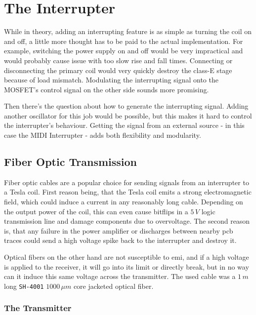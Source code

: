 \section{The Interrupter}

While in theory, adding an interrupting feature is as simple as turning the coil on and off, a little more thought has to be paid to the actual implementation. For example, switching the power supply on and off would be very impractical and would probably cause issue with too slow rise and fall times. Connecting or disconnecting the primary coil would very quickly destroy the class-E stage because of load mismatch. Modulating the interrupting signal onto the MOSFET's control signal on the other side sounds more promising.

Then there's the question about how to generate the interrupting signal. Adding another oscillator for this job would be possible, but this makes it hard to control the interrupter's behaviour. Getting the signal from an external source - in this case the MIDI Interrupter - adds both flexibility and modularity.

\subsection{Fiber Optic Transmission}

Fiber optic cables are a popular choice for sending signals from an interrupter to a Tesla coil. First reason being, that the Tesla coil emits a strong electromagnetic field, which could induce a current in any reasonably long cable. Depending on the output power of the coil, this can even cause bitflips in a \(5\,V\) logic transmission line and damage components due to overvoltage. The second reason is, that any failure in the power amplifier or discharges between nearby \gls{pcb} traces could send a high voltage spike back to the interrupter and destroy it.

Optical fibers on the other hand are not susceptible to \gls{emi}, and if a high voltage is applied to the receiver, it will go into its limit or directly break, but in no way can it induce this same voltage across the transmitter. The used cable was a \(1\,m\) long \texttt{SH-4001} \(1000\,\mu m\) core jacketed optical fiber.

\subsubsection{The Transmitter}

